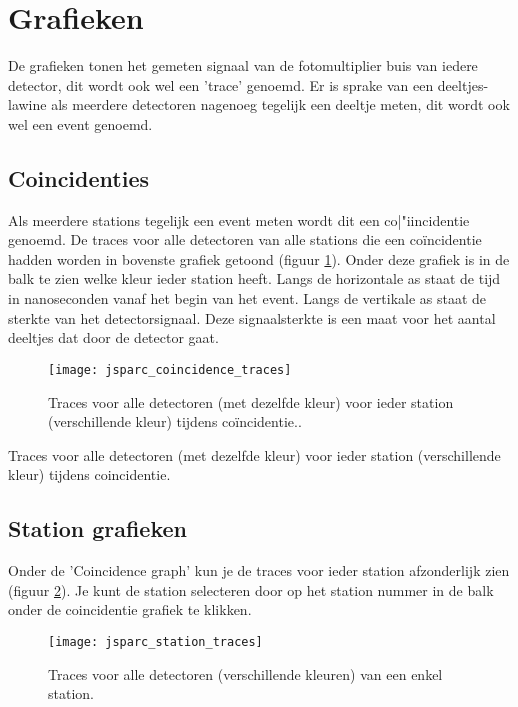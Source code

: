 \section{Grafieken}

De grafieken tonen het gemeten signaal van de fotomultiplier buis van iedere detector, dit wordt ook wel een 'trace' genoemd. Er is sprake van een deeltjes-lawine als meerdere detectoren nagenoeg tegelijk een deeltje meten, dit wordt ook wel een event genoemd.

\subsection{Coincidenties}

Als meerdere stations tegelijk een event meten wordt dit een co|"{i}incidentie genoemd.
De traces voor alle detectoren van alle stations die een co\"incidentie hadden
worden in bovenste grafiek getoond (figuur \ref{fig:stationtrace}). Onder deze grafiek is in de balk te zien 
welke kleur ieder station heeft.  Langs de horizontale as staat de tijd in 
nanoseconden vanaf het begin van het event. Langs de vertikale as staat de 
sterkte van het detectorsignaal. Deze signaalsterkte is een maat voor het aantal deeltjes dat 
door de detector gaat.

\begin{figure}[H]
    \centering
    \texttt{[image: jsparc\_coincidence\_traces]}
    \caption{Traces voor alle detectoren (met dezelfde kleur) voor ieder station 
                 (verschillende kleur) tijdens co\"incidentie..}
    \label{fig:stationtrace}
\end{figure}

   Traces voor alle detectoren (met dezelfde kleur) voor ieder station 
   (verschillende kleur) tijdens coincidentie.
   
\subsection{Station grafieken}

Onder de 'Coincidence graph' kun je de traces voor ieder station afzonderlijk 
zien (figuur \ref{fig:detectortrace}). Je kunt de station selecteren door op het station nummer in de balk 
onder de coincidentie grafiek te klikken.

\begin{figure}[H]
    \centering
    \texttt{[image: jsparc\_station\_traces]}
    \caption{Traces voor alle detectoren (verschillende kleuren) van een enkel station.}
    \label{fig:detectortrace}
\end{figure}

